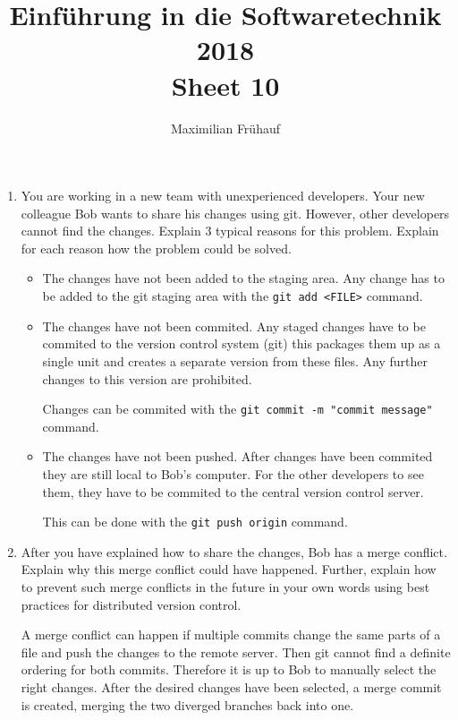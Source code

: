 \documentclass[a4paper, 10pt]{article}
\title{Einführung in die Softwaretechnik 2018 \\ Sheet 10}
\author{Maximilian Frühauf}
\begin{document}
\maketitle
\begin{enumerate}
    \item You are working in a new team with unexperienced developers. 
    Your new colleague Bob wants to share his changes using git. 
    However, other developers cannot find the changes. 
    Explain 3 typical reasons for this problem. Explain for each reason how the problem could be solved.
    \vspace{0.5cm}
    
    \begin{itemize}
        \item The changes have not been added to the staging area. Any change has to be added to the 
        git staging area with the \verb+git add <FILE>+ command.

        \item The changes have not been commited. Any staged changes have to be commited to the version 
        control system (git) this packages them up as a single unit and creates a separate version from these files.
        Any further changes to this version are prohibited.
        
        Changes can be commited with the \verb+git commit -m "commit message"+ command.
        \item The changes have not been pushed. After changes have been commited they are still local to 
        Bob's computer. For the other developers to see them, they have to be commited to the central
        version control server.

        This can be done with the \verb+git push origin+ command.
    \end{itemize}

    \item
    After you have explained how to share the changes, Bob has a merge conflict. 
    Explain why this merge conflict could have happened. 
    Further, explain how to prevent such merge conflicts in the future in your own words using 
    best practices for distributed version control. 
    \vspace{0.5cm}

    A merge conflict can happen if multiple commits change the same parts of a file and push the changes to the remote server.
    Then git cannot find a definite ordering for both commits.
    Therefore it is up to Bob to manually select the right changes.
    After the desired changes have been selected, a merge commit is created, merging the two diverged branches 
    back into one. 


\end{enumerate}
\end{document}
